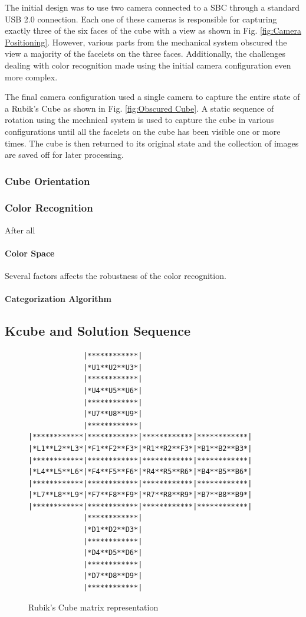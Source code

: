 \documentclass[final, letterpaper, 10 pt, conference, twocolumn]{IEEEtran}
\begin{document}
The initial design was to use two camera connected to a SBC through a standard USB 2.0 connection. Each one of these cameras is responsible for capturing exactly three of the six faces of the cube with a view as shown in Fig. \ref{fig:Camera Positioning}. However, various parts from the mechanical system obscured the view a majority of the facelets on the three faces. Additionally, the challenges dealing with color recognition made using the initial camera configuration even more complex.

The final camera configuration used a single camera to capture the entire state of a Rubik's Cube as shown in Fig. \ref{fig:Obscured Cube}. A static sequence of rotation using the mechnical system is used to capture the cube in various configurations until all the facelets on the cube has been visible one or more times. The cube is then returned to its original state and the collection of images are saved off for later processing.

\subsubsection{Cube Orientation}
\subsubsection{Color Recognition}
After all 
\paragraph{Color Space}
Several factors affects the robustness of the color recognition. 
\paragraph{Categorization Algorithm}


\subsection{Kcube and Solution Sequence}
\begin{figure}[!ht]
\begin{center}
\begin{BVerbatim}
             |************|
             |*U1**U2**U3*|
             |************|
             |*U4**U5**U6*|
             |************|
             |*U7**U8**U9*|
             |************|
|************|************|************|************|
|*L1**L2**L3*|*F1**F2**F3*|*R1**R2**F3*|*B1**B2**B3*|
|************|************|************|************|
|*L4**L5**L6*|*F4**F5**F6*|*R4**R5**R6*|*B4**B5**B6*|
|************|************|************|************|
|*L7**L8**L9*|*F7**F8**F9*|*R7**R8**R9*|*B7**B8**B9*|
|************|************|************|************|
             |************|
             |*D1**D2**D3*|
             |************|
             |*D4**D5**D6*|
             |************|
             |*D7**D8**D9*|
             |************|
\end{BVerbatim}
\end{center}
\caption{Rubik's Cube matrix representation}
\label{fig:matrix layout}
\end{figure}
\end{document}
